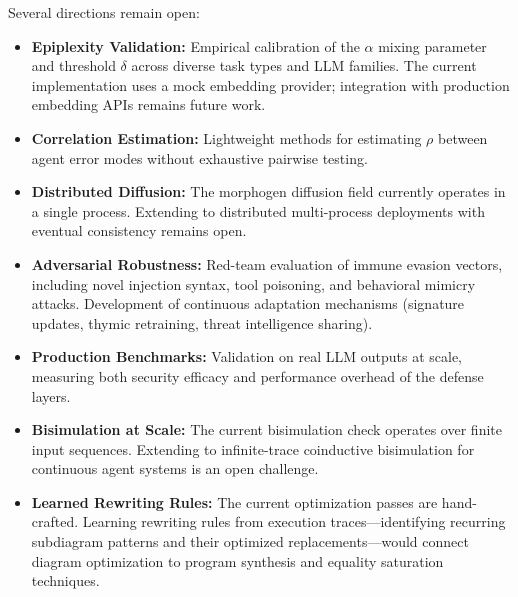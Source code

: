 Several directions remain open:
\begin{itemize}[leftmargin=*]
\item \textbf{Epiplexity Validation:} Empirical calibration of the $\alpha$ mixing parameter and threshold
$\delta$ across diverse task types and LLM families. The current implementation uses a mock embedding
provider; integration with production embedding APIs remains future work.
\item \textbf{Correlation Estimation:} Lightweight methods for estimating $\rho$ between agent error modes
without exhaustive pairwise testing.
\item \textbf{Distributed Diffusion:} The morphogen diffusion field currently operates in a single process.
Extending to distributed multi-process deployments with eventual consistency remains open.
\item \textbf{Adversarial Robustness:} Red-team evaluation of immune evasion vectors, including novel
injection syntax, tool poisoning, and behavioral mimicry attacks. Development of continuous adaptation
mechanisms (signature updates, thymic retraining, threat intelligence sharing).
\item \textbf{Production Benchmarks:} Validation on real LLM outputs at scale, measuring both security
efficacy and performance overhead of the defense layers.
\item \textbf{Bisimulation at Scale:} The current bisimulation check operates over finite input sequences.
Extending to infinite-trace coinductive bisimulation for continuous agent systems is an open challenge.
\item \textbf{Learned Rewriting Rules:} The current optimization passes are hand-crafted. Learning
rewriting rules from execution traces---identifying recurring subdiagram patterns and their optimized
replacements---would connect diagram optimization to program synthesis and equality saturation techniques.
\end{itemize}
